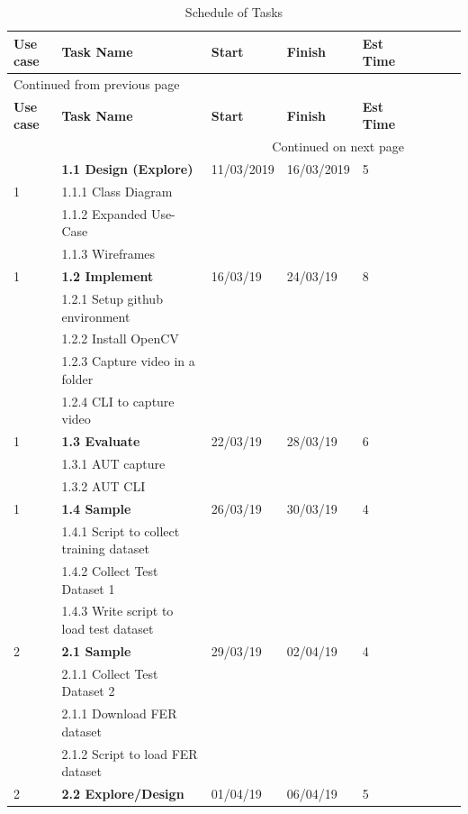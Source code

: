 \documentclass[12pt,a4paper,man]{report}
\begin{document}
\begin{longtable}{|l|l|l|l|l|l|l|lp{3cm}|}
\caption{\label{table:itersched}
Schedule of Tasks}
\\
\hline
\textbf{Use case} & \textbf{Task Name} & \textbf{Start} & \textbf{Finish} & \textbf{Est Time}\\
\hline
\endfirsthead
\multicolumn{5}{l}{Continued from previous page} \\
\hline

\textbf{Use case} & \textbf{Task Name} & \textbf{Start} & \textbf{Finish} & \textbf{Est Time} \\

\hline
\endhead
\hline\multicolumn{5}{r}{Continued on next page} \\
\endfoot
\endlastfoot
\hline
 & \textbf{1.1 Design (Explore)} & 11/03/2019 & 16/03/2019 & 5\\
1 & 1.1.1 Class Diagram &  &  & \\
 & 1.1.2 Expanded Use-Case &  &  & \\
 & 1.1.3 Wireframes &  &  & \\
\hline
1 & \textbf{1.2 Implement} & 16/03/19 & 24/03/19 & 8\\
 & 1.2.1 Setup github environment &  &  & \\
 & 1.2.2 Install OpenCV &  &  & \\
 & 1.2.3 Capture video in a folder &  &  & \\
 & 1.2.4 CLI to capture video &  &  & \\
\hline
1 & \textbf{1.3 Evaluate} & 22/03/19 & 28/03/19 & 6\\
 & 1.3.1 AUT capture &  &  & \\
 & 1.3.2 AUT CLI &  &  & \\
\hline
1 & \textbf{1.4 Sample} & 26/03/19 & 30/03/19 & 4\\
 & 1.4.1 Script to collect training dataset &  &  & \\
 & 1.4.2 Collect Test Dataset 1 &  &  & \\
 & 1.4.3 Write script to load test dataset &  &  & \\
\hline
2 & \textbf{2.1 Sample} & 29/03/19 & 02/04/19 & 4\\
 & 2.1.1 Collect Test Dataset 2 &  &  & \\
 & 2.1.1 Download FER dataset &  &  & \\
 & 2.1.2 Script to load FER dataset &  &  & \\
\hline
2 & \textbf{2.2 Explore/Design} & 01/04/19 & 06/04/19 & 5\\

\end{longtable}
\end{document}
